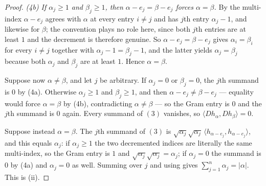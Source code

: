 \begin{proof}
\emph{(4b) If $\alpha_j \geq 1$ and $\beta_j \geq 1$, then
$\alpha - e_j = \beta - e_j$ forces $\alpha = \beta$.}  By
 the multi-index $\alpha - e_j$ agrees with $\alpha$ at
every entry $i \neq j$ and has $j$th entry $\alpha_j - 1$, and likewise for
$\beta$; the convention plays no role here, since both $j$th entries are at least
$1$ and the decrement is therefore genuine.  So $\alpha - e_j = \beta - e_j$ gives
$\alpha_i = \beta_i$ for every $i \neq j$ together with
$\alpha_j - 1 = \beta_j - 1$, and the latter yields $\alpha_j = \beta_j$ because
both $\alpha_j$ and $\beta_j$ are at least $1$.  Hence $\alpha = \beta$.

Suppose now $\alpha \neq \beta$, and let $j$ be arbitrary.  If $\alpha_j = 0$ or
$\beta_j = 0$, the $j$th summand is $0$ by (4a).  Otherwise $\alpha_j \geq 1$ and
$\beta_j \geq 1$, and then $\alpha - e_j \neq \beta - e_j$ --- equality would force
$\alpha = \beta$ by (4b), contradicting $\alpha \neq \beta$ --- so the Gram entry
is $0$ and the $j$th summand is $0$ again.  Every summand of $(3)$ vanishes, so
$\langle Dh_\alpha, Dh_\beta\rangle = 0$.

Suppose instead $\alpha = \beta$.  The $j$th summand of $(3)$ is
$\sqrt{\alpha_j}\sqrt{\alpha_j}\,\langle h_{\alpha-e_j}, h_{\alpha-e_j}\rangle$,
and this equals $\alpha_j$: if $\alpha_j \geq 1$ the two decremented indices are
literally the same multi-index, so the Gram entry is $1$ and
$\sqrt{\alpha_j}\sqrt{\alpha_j} = \alpha_j$; if $\alpha_j = 0$ the summand is $0$
by (4a) and $\alpha_j = 0$ as well.  Summing over $j$ and using
 gives $\sum_{j=1}^n \alpha_j = |\alpha|$.  This is (ii).
\end{proof}
